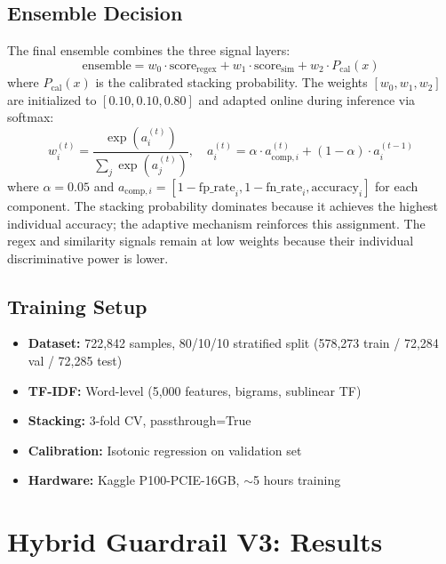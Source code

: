 \documentclass[12pt,a4paper]{article}
\begin{document}
\subsection{Ensemble Decision}

The final ensemble combines the three signal layers:
\begin{equation}
\text{ensemble} = w_0 \cdot \text{score}_{\text{regex}} + w_1 \cdot \text{score}_{\text{sim}} + w_2 \cdot P_{\text{cal}}(x)
\label{eq:ensemble}
\end{equation}
where $P_{\text{cal}}(x)$ is the calibrated stacking probability. The weights $[w_0, w_1, w_2]$ are initialized to $[0.10, 0.10, 0.80]$ and adapted online during inference via softmax:
\begin{equation}
w_i^{(t)} = \frac{\exp(a_i^{(t)})}{\sum_j \exp(a_j^{(t)})}, \quad a_i^{(t)} = \alpha \cdot a_{\text{comp},i}^{(t)} + (1-\alpha) \cdot a_i^{(t-1)}
\label{eq:adaptive_weights}
\end{equation}
where $\alpha = 0.05$ and $a_{\text{comp},i} = [1 - \text{fp\_rate}_i, 1 - \text{fn\_rate}_i, \text{accuracy}_i]$ for each component. The stacking probability dominates because it achieves the highest individual accuracy; the adaptive mechanism reinforces this assignment. The regex and similarity signals remain at low weights because their individual discriminative power is lower.

\subsection{Training Setup}

\begin{itemize}[leftmargin=*]
    \item \textbf{Dataset:} 722,842 samples, 80/10/10 stratified split (578,273 train / 72,284 val / 72,285 test)
    \item \textbf{TF-IDF:} Word-level (5,000 features, bigrams, sublinear TF)
    \item \textbf{Stacking:} 3-fold CV, passthrough=True
    \item \textbf{Calibration:} Isotonic regression on validation set
    \item \textbf{Hardware:} Kaggle P100-PCIE-16GB, $\sim$5 hours training
\end{itemize}

\section{Hybrid Guardrail V3: Results}\label{sec:results}
\end{document}
